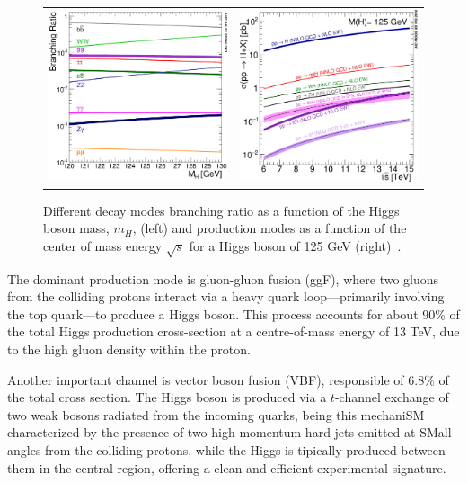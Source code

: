 \documentclass[11pt,twoside]{book}
\begin{document}
\begin{figure}[htbp]
\begin{center}
\begin{tabular}{cc}
\includegraphics[width=0.5\linewidth]{images/higgs_dec.pdf}  &
\includegraphics[width=0.5\linewidth]{images/higgs_prod.pdf}  
\end{tabular}
\caption{\label{pdgplots}
Different decay modes branching ratio as a function of the Higgs boson mass, $m_{H}$, (left) and production modes as a function of the center of mass energy $\sqrt{s}$ for a Higgs boson of 125 GeV (right)~\cite{PDG}.
}
\end{center}
\end{figure}

The dominant production mode is gluon-gluon fusion (ggF), where two gluons from the colliding protons interact via a heavy quark loop—primarily involving the top quark—to produce a Higgs boson. This process accounts for about 90\% of the total Higgs production cross-section at a centre-of-mass energy of 13 TeV, due to the high gluon density within the proton.

Another important channel is vector boson fusion (VBF), responsible of $6.8\%$ of the total cross section. The Higgs boson is produced via a $t$-channel exchange of two weak bosons radiated from the incoming quarks, being this mechani\acrshort{SM} characterized by the presence of two high-momentum hard jets emitted at \acrshort{SM}all angles from the colliding protons, while the Higgs is tipically produced between them in the central region, offering a clean and efficient experimental signature. 
\end{document}
